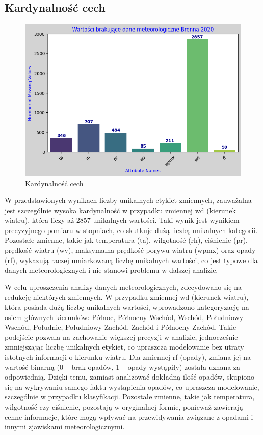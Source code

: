 \documentclass[10pt,a4paper]{article}
\begin{document}
\subsection*{Kardynalność cech}
\begin{figure}[h]
	\centering
	\includegraphics[scale=0.7]{cardinality.png}
	\caption{Kardynalność cech}
	\label{fig:my_label}
\end{figure}
\noindent W przedstawionych wynikach liczby unikalnych etykiet zmiennych, zauważalna jest szczególnie wysoka kardynalność w przypadku zmiennej wd (kierunek wiatru), która liczy aż 2857 unikalnych wartości. Taki wynik jest wynikiem precyzyjnego pomiaru w stopniach, co skutkuje dużą liczbą unikalnych kategorii. Pozostałe zmienne, takie jak temperatura (ta), wilgotność (rh), ciśnienie (pr), prędkość wiatru (wv), maksymalna prędkość porywu wiatru (wpmx) oraz opady (rf), wykazują raczej umiarkowaną liczbę unikalnych wartości, co jest typowe dla danych meteorologicznych i nie stanowi problemu w dalszej analizie.
\par
\hspace{0.75cm}
W celu uproszczenia analizy danych meteorologicznych, zdecydowano się na redukcję niektórych zmiennych. W przypadku zmiennej wd (kierunek wiatru), która posiada dużą liczbę unikalnych wartości, wprowadzono kategoryzację na osiem głównych kierunków: Północ, Północny Wschód, Wschód, Południowy Wschód, Południe, Południowy Zachód, Zachód i Północny Zachód. Takie podejście pozwala na zachowanie większej precyzji w analizie, jednocześnie zmniejszając liczbę unikalnych etykiet, co upraszcza modelowanie bez utraty istotnych informacji o kierunku wiatru.
Dla zmiennej rf (opady), zmiana jej na wartość binarną (0 – brak opadów, 1 – opady wystąpiły) została uznana za odpowiednią. Dzięki temu, zamiast analizować dokładną ilość opadów, skupiono się na wykrywaniu samego faktu wystąpienia opadów, co upraszcza modelowanie, szczególnie w przypadku klasyfikacji.
Pozostałe zmienne, takie jak temperatura, wilgotność czy ciśnienie, pozostają w oryginalnej formie, ponieważ zawierają cenne informacje, które mogą wpływać na przewidywania związane z opadami i innymi zjawiskami meteorologicznymi.
\end{document}
